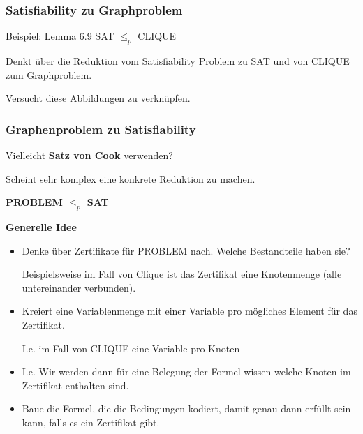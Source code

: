 \documentclass[a4paper, 11pt]{article}
\def\Lr{\mathcal{L}_\text{R}}
\newcommand\myTitle[1]{{\large \textbf {#1}}}
\begin{document}
\subsubsection{Satisfiability zu Graphproblem}
	Beispiel: Lemma 6.9 SAT $\leq_p$ CLIQUE

	Denkt über die Reduktion vom Satisfiability Problem zu SAT und von CLIQUE zum Graphproblem.

	Versucht diese Abbildungen zu verknüpfen.


\subsubsection{Graphenproblem zu Satisfiability}
	Vielleicht \textbf{Satz von Cook} verwenden?

	Scheint sehr komplex eine konkrete Reduktion zu machen.


	\myTitle{PROBLEM $\leq_p$ SAT}
	
	\textbf{Generelle Idee}

	\begin{itemize}[label= -]
		
		\item Denke über Zertifikate für PROBLEM nach. Welche Bestandteile haben sie?
		
		Beispielsweise im Fall von Clique ist das Zertifikat eine Knotenmenge (alle untereinander verbunden).

		
		\item Kreiert eine Variablenmenge mit einer Variable pro mögliches Element für das Zertifikat. 
		
		I.e. im Fall von CLIQUE eine Variable pro Knoten

		
		\item I.e. Wir werden dann für eine Belegung der Formel wissen welche Knoten im Zertifikat enthalten sind.
		
		\item Baue die Formel, die die Bedingungen kodiert, damit genau dann erfüllt sein kann, falls es ein Zertifikat gibt.
	\end{itemize}

            
\end{document}
